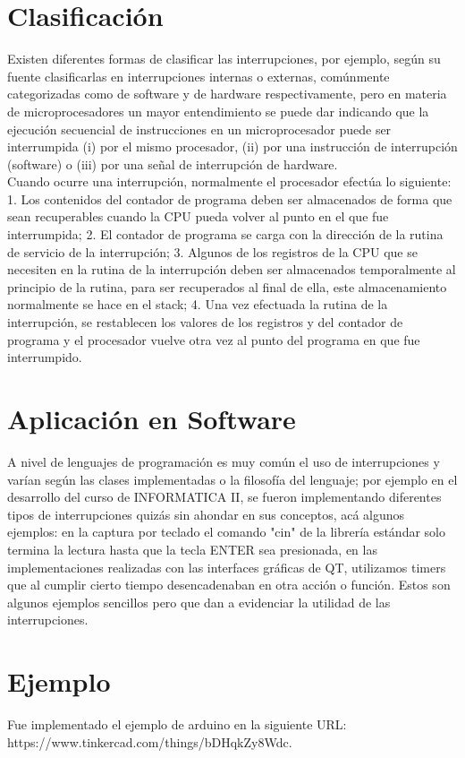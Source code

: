 \documentclass[]{article}
\begin{document}
\begin{multicols}{2}
	\section{Clasificación}
		Existen diferentes formas de clasificar las interrupciones, por ejemplo, según su fuente clasificarlas en interrupciones internas o externas, comúnmente categorizadas como de software y de hardware respectivamente\cite{mym}, pero en materia de microprocesadores un mayor entendimiento se puede dar indicando que la ejecución secuencial de instrucciones en un microprocesador puede ser interrumpida (i) por el mismo procesador, (ii) por una instrucción de interrupción (software) o (iii) por una señal de interrupción de hardware\cite{pcbased}.\\
		Cuando ocurre una interrupción, normalmente el procesador efectúa lo siguiente: 1. Los contenidos del contador de programa deben ser almacenados de forma que sean recuperables cuando la CPU pueda volver al punto en el que fue interrumpida; 2. El contador de programa se carga con la dirección de la rutina de servicio de la interrupción; 3. Algunos de los registros de la CPU que se necesiten en la rutina de la interrupción deben ser almacenados temporalmente al principio de la rutina, para ser recuperados al final de ella, este almacenamiento normalmente se hace en el stack; 4. Una vez efectuada la rutina de la interrupción, se restablecen los valores de los registros y del contador de programa y el procesador vuelve otra vez al punto del programa en que fue interrumpido\cite{edymicrop}.
	\section{Aplicación en Software}
		A nivel de lenguajes de programación es muy común el uso de interrupciones y varían según las clases implementadas o la filosofía del lenguaje; por ejemplo en el desarrollo del curso de INFORMATICA II, se fueron implementando diferentes tipos de interrupciones quizás sin ahondar en sus conceptos, acá algunos ejemplos: en la captura por teclado el comando "cin" de la librería estándar solo termina la lectura hasta que la tecla ENTER sea presionada, en las implementaciones realizadas con las interfaces gráficas de QT, utilizamos timers que al cumplir cierto tiempo desencadenaban en otra acción o función. Estos son algunos ejemplos sencillos pero que dan a evidenciar la utilidad de las interrupciones.
	\section{Ejemplo}
		Fue implementado el ejemplo de arduino en la siguiente URL: https://www.tinkercad.com/things/bDHqkZy8Wdc.
\end{multicols}
\end{document}

